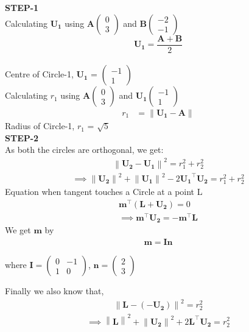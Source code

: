 \documentclass[journal,10pt,twocolumn]{article}
\providecommand{\norm}[1]{\left\lVert#1\right\rVert}
\providecommand{\brak}[1]{\ensuremath{\left(#1\right)}}
\newcommand{\myvec}[1]{\ensuremath{\begin{pmatrix}#1\end{pmatrix}}}
\let\vec\mathbf
\begin{document}
\textbf{STEP-1}\vspace{3mm}\\
Calculating $\vec{U_1}$ using  $\vec{A}\myvec{0\\3}$ and $\vec{B}\myvec{-2\\-1}$ \vspace{2mm}
\begin{equation}
\vec{U_1} = \frac{\vec{A}+\vec{B}}2
\end{equation}\vspace{1mm}\\ 
Centre of Circle-1, $\vec{U_1}$ = $\myvec{-1 \\ 1}$\vspace{2mm}\\ 
Calculating $r_1$ using $\vec{A}\myvec{0\\3}$ and $\vec{U_1}\myvec{-1\\1}$ \vspace{1mm}
\begin{align}
r_1 &= \norm{\vec{U_1} - \vec{A}} 
\end{align}
Radius of Circle-1, $r_1$ = $\sqrt{5}$\vspace{3mm}\\
\textbf{STEP-2}\vspace{2mm}\\
As both the circles are orthogonal, we get: \\\vspace{1mm}
\begin{align}
\norm{\vec{U_2} - \vec{U_1}}^2 = r_1^2 + r_2^2
\end{align}
\begin{align}
    \implies \norm{\vec{U_2}}^2 + \norm{\vec{U_1}}^2 - 2\vec{U_1}^{\top}\vec{U_2} = r_1^2 + r_2^2
\end{align}
Equation when tangent touches a Circle at a point L
		    \begin{align}
			    \vec{m}^{\top} \brak{\vec{L}+\vec{U_2}} = 0 \\
			    \implies \vec{m}^{\top}\vec{U_2} = - \vec{m}^{\top}\vec{L} 
		    \end{align}
We get $\vec{m}$ by
\begin{align}
\vec{m} = \vec{I}\vec{n}
\end{align}

\begin{center}
where $\vec{I} = \myvec{0 & -1 \\ 1 & 0}$, $\vec{n} = \myvec{2 \\ 3}$ \\
\end{center}
Finally we also know that,
\begin{align}
\norm{\vec{L} - \vec{(-U_2)}}^2 = r_2^2
\end{align}
\begin{align}
    \implies \norm{\vec{L}}^2 + \norm{\vec{U_2}}^2 + 2\vec{L}^{\top}\vec{U_2} = r_2^2
\end{align}    
\end{document}
